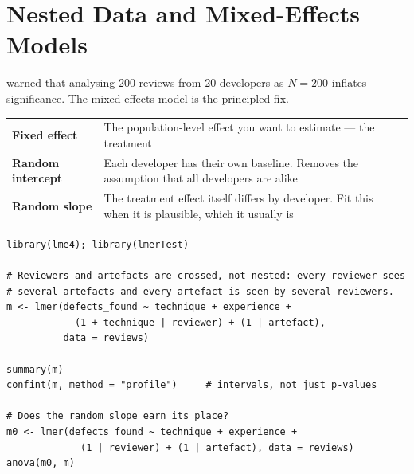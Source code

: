 \section{Nested Data and Mixed-Effects Models}

 warned that analysing 200 reviews from 20 developers as
$N = 200$ inflates significance. The mixed-effects model is the principled fix.

\begin{center}
\small
\begin{tabular}{@{}L{3.4cm}L{10.9cm}@{}}
\toprule
\textbf{Fixed effect} & The population-level effect you want to estimate ---
                        the treatment \\
\textbf{Random intercept} & Each developer has their own baseline. Removes the
                        assumption that all developers are alike \\
\textbf{Random slope}  & The treatment effect itself differs by developer. Fit
                        this when it is plausible, which it usually is \\
\bottomrule
\end{tabular}
\end{center}

\begin{lstlisting}[language=Rlang, caption={A mixed-effects model for the code review
experiment, with reviewer and the reviewed artefact as crossed random effects.}]
library(lme4); library(lmerTest)

# Reviewers and artefacts are crossed, not nested: every reviewer sees
# several artefacts and every artefact is seen by several reviewers.
m <- lmer(defects_found ~ technique + experience +
            (1 + technique | reviewer) + (1 | artefact),
          data = reviews)

summary(m)
confint(m, method = "profile")     # intervals, not just p-values

# Does the random slope earn its place?
m0 <- lmer(defects_found ~ technique + experience +
             (1 | reviewer) + (1 | artefact), data = reviews)
anova(m0, m)
\end{lstlisting}

